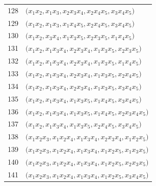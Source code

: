 {\begin{longtable}{@{}r>{\raggedright\arraybackslash}p{}@{}}
128 & \(\bigl(x_{1}x_{2},\allowbreak x_{1}x_{3},\allowbreak x_{2}x_{3}x_{4},\allowbreak x_{2}x_{4}x_{5},\allowbreak x_{3}x_{4}x_{5}\bigr)\) \\
129 & \(\bigl(x_{1}x_{2},\allowbreak x_{1}x_{3},\allowbreak x_{1}x_{4}x_{5},\allowbreak x_{2}x_{4}x_{5},\allowbreak x_{3}x_{4}x_{5}\bigr)\) \\
130 & \(\bigl(x_{1}x_{2},\allowbreak x_{3}x_{4},\allowbreak x_{1}x_{3}x_{5},\allowbreak x_{2}x_{3}x_{5},\allowbreak x_{1}x_{4}x_{5}\bigr)\) \\
131 & \(\bigl(x_{1}x_{2},\allowbreak x_{1}x_{3}x_{4},\allowbreak x_{2}x_{3}x_{4},\allowbreak x_{1}x_{3}x_{5},\allowbreak x_{2}x_{3}x_{5}\bigr)\) \\
132 & \(\bigl(x_{1}x_{2},\allowbreak x_{1}x_{3}x_{4},\allowbreak x_{2}x_{3}x_{4},\allowbreak x_{1}x_{3}x_{5},\allowbreak x_{1}x_{4}x_{5}\bigr)\) \\
133 & \(\bigl(x_{1}x_{2},\allowbreak x_{1}x_{3}x_{4},\allowbreak x_{2}x_{3}x_{4},\allowbreak x_{1}x_{3}x_{5},\allowbreak x_{2}x_{4}x_{5}\bigr)\) \\
134 & \(\bigl(x_{1}x_{2},\allowbreak x_{1}x_{3}x_{4},\allowbreak x_{2}x_{3}x_{4},\allowbreak x_{1}x_{3}x_{5},\allowbreak x_{3}x_{4}x_{5}\bigr)\) \\
135 & \(\bigl(x_{1}x_{2},\allowbreak x_{1}x_{3}x_{4},\allowbreak x_{1}x_{3}x_{5},\allowbreak x_{1}x_{4}x_{5},\allowbreak x_{3}x_{4}x_{5}\bigr)\) \\
136 & \(\bigl(x_{1}x_{2},\allowbreak x_{1}x_{3}x_{4},\allowbreak x_{1}x_{3}x_{5},\allowbreak x_{1}x_{4}x_{5},\allowbreak x_{2}x_{3}x_{4}x_{5}\bigr)\) \\
137 & \(\bigl(x_{1}x_{2},\allowbreak x_{1}x_{3}x_{4},\allowbreak x_{1}x_{3}x_{5},\allowbreak x_{2}x_{4}x_{5},\allowbreak x_{3}x_{4}x_{5}\bigr)\) \\
138 & \(\bigl(x_{1}x_{2}x_{3},\allowbreak x_{1}x_{2}x_{4},\allowbreak x_{1}x_{3}x_{4},\allowbreak x_{2}x_{3}x_{4},\allowbreak x_{1}x_{2}x_{5}\bigr)\) \\
139 & \(\bigl(x_{1}x_{2}x_{3},\allowbreak x_{1}x_{2}x_{4},\allowbreak x_{1}x_{3}x_{4},\allowbreak x_{1}x_{2}x_{5},\allowbreak x_{1}x_{3}x_{5}\bigr)\) \\
140 & \(\bigl(x_{1}x_{2}x_{3},\allowbreak x_{1}x_{2}x_{4},\allowbreak x_{1}x_{3}x_{4},\allowbreak x_{1}x_{2}x_{5},\allowbreak x_{2}x_{3}x_{5}\bigr)\) \\
141 & \(\bigl(x_{1}x_{2}x_{3},\allowbreak x_{1}x_{2}x_{4},\allowbreak x_{1}x_{3}x_{4},\allowbreak x_{1}x_{2}x_{5},\allowbreak x_{3}x_{4}x_{5}\bigr)\) \\

\end{longtable}}
